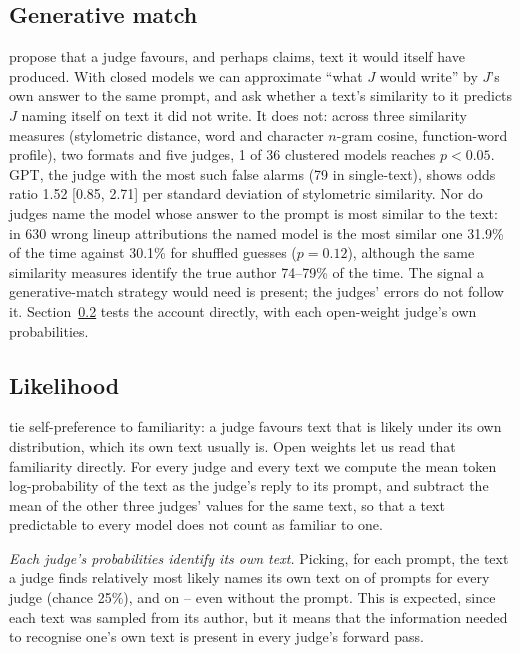 \subsection{Generative match}
\label{sec:genmatch}
\citet{wataoka2024perplexity} propose that a judge favours, and perhaps
claims, text it would itself have produced. With closed models we can
approximate ``what $J$ would write'' by $J$'s own answer to the same prompt,
and ask whether a text's similarity to it predicts $J$ naming itself on text
it did not write. It does not: across three similarity measures (stylometric
distance, word and character $n$-gram cosine, function-word profile), two
formats and five judges, 1 of 36 clustered models reaches $p<0.05$. GPT, the
judge with the most such false alarms (79 in single-text), shows odds ratio
1.52 [0.85, 2.71] per standard deviation of stylometric similarity. Nor do
judges name the model whose answer to the prompt is most similar to the
text: in 630 wrong lineup attributions the named model is the most similar
one 31.9\% of the time against 30.1\% for shuffled guesses ($p=0.12$),
although the same similarity measures identify the true author 74--79\% of
the time. The signal a generative-match strategy would need is present; the
judges' errors do not follow it. Section~\ref{sec:likelihood} tests the
account directly, with each open-weight judge's own probabilities.

\subsection{Likelihood}
\label{sec:likelihood}
\citet{wataoka2024perplexity} tie self-preference to familiarity: a judge
favours text that is likely under its own distribution, which its own text
usually is. Open weights let us read that familiarity directly. For every
judge and every text we compute the mean token log-probability of the text
as the judge's reply to its prompt, and subtract the mean of the other three
judges' values for the same text, so that a text predictable to every model
does not count as familiar to one.

\emph{Each judge's probabilities identify its own text.} Picking, for each
prompt, the text a judge finds relatively most likely names its own text on
\OWLikCondAccMin{} of prompts for every judge (chance 25\%), and on \OWLikUncAccMin{}--\OWLikUncAccMax{} even without the
prompt. This is expected, since each text was sampled from its author, but
it means that the information needed to recognise one's own text is present
in every judge's forward pass.

